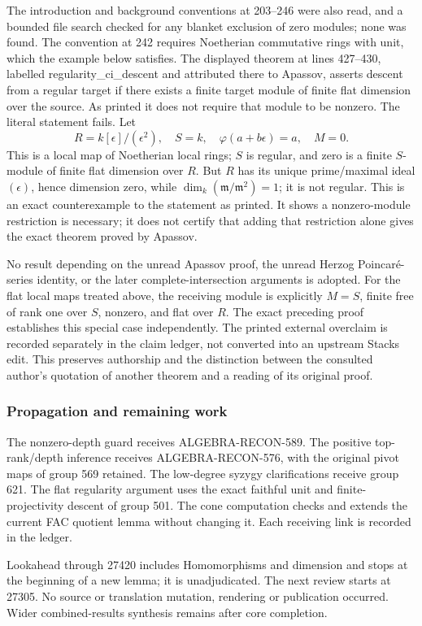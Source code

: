 The introduction and background conventions at 203--246 were also read, and a bounded file search checked for any blanket exclusion of zero modules; none was found. The convention at 242 requires Noetherian commutative rings with unit, which the example below satisfies. The displayed theorem at lines 427--430, labelled regularity\_ci\_descent and attributed there to Apassov, asserts descent from a regular target if there exists a finite target module of finite flat dimension over the source. As printed it does not require that module to be nonzero. The literal statement fails. Let \[
R=k[\epsilon]/(\epsilon^2),\quad S=k,\quad
\varphi(a+b\epsilon)=a,\quad M=0 .
\] This is a local map of Noetherian local rings; \(S\) is regular, and zero is a finite \(S\)-module of finite flat dimension over \(R\). But \(R\) has its unique prime/maximal ideal \((\epsilon)\), hence dimension zero, while \(\dim_k(\mathfrak m/\mathfrak m^2)=1\); it is not regular. This is an exact counterexample to the statement as printed. It shows a nonzero-module restriction is necessary; it does not certify that adding that restriction alone gives the exact theorem proved by Apassov.

No result depending on the unread Apassov proof, the unread Herzog Poincaré-series identity, or the later complete-intersection arguments is adopted. For the flat local maps treated above, the receiving module is explicitly \(M=S\), finite free of rank one over \(S\), nonzero, and flat over \(R\). The exact preceding proof establishes this special case independently. The printed external overclaim is recorded separately in the claim ledger, not converted into an upstream Stacks edit. This preserves authorship and the distinction between the consulted author's quotation of another theorem and a reading of its original proof.

\subsubsection{Propagation and remaining work}\label{propagation-and-remaining-work}

The nonzero-depth guard receives ALGEBRA-RECON-589. The positive top-rank/depth inference receives ALGEBRA-RECON-576, with the original pivot maps of group 569 retained. The low-degree syzygy clarifications receive group 621. The flat regularity argument uses the exact faithful unit and finite-projectivity descent of group 501. The cone computation checks and extends the current FAC quotient lemma without changing it. Each receiving link is recorded in the ledger.

Lookahead through 27420 includes Homomorphisms and dimension and stops at the beginning of a new lemma; it is unadjudicated. The next review starts at 27305. No source or translation mutation, rendering or publication occurred. Wider combined-results synthesis remains after core completion.
